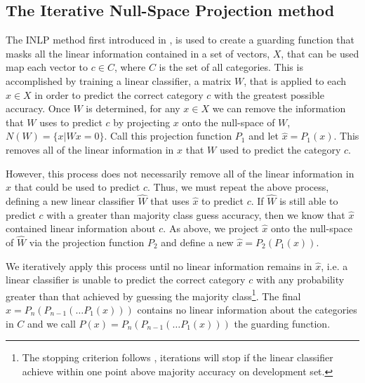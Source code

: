\documentclass[11pt,a4paper]{article}
\begin{document}
\subsection{The Iterative Null-Space Projection method}
\label{sec:inlp-method}

The INLP method first introduced in \citealp{inlp}, is used to create a guarding function that masks all the linear information contained in a set of vectors, $X$, that can be used map each vector to $c \in C$, where $C$ is the set of all categories. This is accomplished by training a linear classifier, a matrix $W$, that is applied to each $x \in X$ in order to predict the correct category $c$ with the greatest possible accuracy. 
Once $W$ is determined, for any $x \in X$ we can remove the information that $W$ uses to predict $c$ by projecting $x$ onto the null-space of $W$, $N(W) = \{x | Wx=0\}$. Call this projection function $P_1$ and let $\hat{x} = P_1(x)$. This removes all of the linear information in $x$ that $W$ used to predict the category $c$. 

However, this process does not necessarily remove all of the linear information in $x$ that could be used to predict $c$. 
Thus, we must repeat the above process, defining a new linear classifier $\hat{W}$ that uses $\hat{x}$  to predict $c$. If $\hat{W}$ is still able to predict $c$ with a greater than majority class guess accuracy, then we know that $\hat{x}$ contained linear information about $c$. As above, we project $\hat{x}$ onto the null-space of $\hat{W}$ via the projection function $P_2$ and define a new $\hat{x} = P_2(P_1(x))$.

We iteratively apply this process until no linear information remains in $\hat{x}$, i.e. a linear classifier is unable to predict the correct category $c$ with any probability greater than that achieved by guessing the majority class\footnote{The stopping criterion follows \citealp{amnesia}, iterations will stop if the linear classifier achieve within one point above majority accuracy on development set.}. The final $\hat{x} = P_n(P_{n-1}(\dots P_1(x)))$ contains no linear information about the categories in $C$ and we call $P(x) = P_n(P_{n-1}(\dots P_1(x)))$ the guarding function. 
\end{document}

